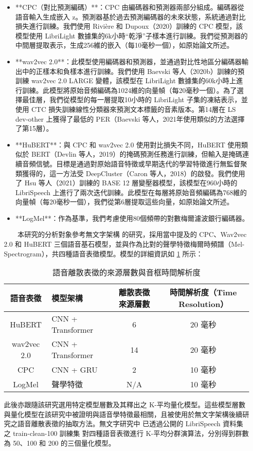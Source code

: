 \begin{itemize}
    \item **CPC（對比預測編碼）**：CPC 由編碼器和預測器兩部分組成。編碼器從語音輸入生成嵌入 z。預測器基於過去預測編碼器的未來狀態，系統通過對比損失進行訓練。我們使用 Rivière 和 Dupoux（2020）訓練的 CPC 模型，該模型使用 LibriLight 數據集的6k小時“乾淨”子樣本進行訓練。我們從預測器的中間層提取表示，生成256維的嵌入（每10毫秒一個），如原始論文所述。
    \item **wav2vec 2.0**：此模型使用編碼器和預測器，並通過對比性地區分編碼器輸出中的正樣本和負樣本進行訓練。我們使用 Baevski 等人（2020b）訓練的預訓練 wav2vec 2.0 LARGE 變體，該模型在 LibriLight 數據集的60k小時上進行訓練。此模型將原始音頻編碼為1024維的向量幀（每20毫秒一個）。為了選擇最佳層，我們從模型的每一層提取10小時的 LibriLight 子集的凍結表示，並使用 CTC 損失訓練線性分類器來預測文本標籤的音素版本。第14層在 LS dev-other 上獲得了最低的 PER（Baevski 等人，2021年使用類似的方法選擇了第15層）。
    \item **HuBERT**：與 CPC 和 wav2vec 2.0 使用對比損失不同，HuBERT 使用類似於 BERT（Devlin 等人，2019）的掩碼預測任務進行訓練，但輸入是掩碼連續音頻信號。目標是通過對原始語音特徵或早期迭代的學習特徵進行無監督聚類獲得的，這一方法受 DeepCluster（Caron 等人，2018）的啟發。我們使用了 Hsu 等人（2021）訓練的 BASE 12 層變壓器模型，該模型在960小時的 LibriSpeech 上進行了兩次迭代訓練。此模型在每層將原始音頻編碼為768維的向量幀（每20毫秒一個），我們從第6層提取這些向量，如原始論文所述。
    \item **LogMel**：作為基準，我們考慮使用80個頻帶的對數梅爾濾波銀行編碼器。
\end{itemize}


　　本研究的分析對象參考無文字架構 \cite{noauthor_textless_2021, lakhotia_generative_2021, lakhotia_generative_2021-1} 的研究，採用當中提及的 CPC、Wav2vec 2.0 和 HuBERT 三個語音基石模型，並與作為比對的聲學特徵梅爾時頻譜（Mel-Spectrogram），共四種語音表徵模型。模型的詳細資訊如 \ref{tab:model-info} 所示：

\begin{table}
    \centering
    \begin{tabular}{|c|l|c|c|} \hline 
         語音表徵&   模型架構&離散表徵來源層數& 時間解析度（Time Resolution）\\ \hline 
         HuBERT      &   CNN + Transformer&6& 20 毫秒\\ \hline 
         wav2vec 2.0 &   CNN + Transformer&14& 20 毫秒\\ \hline 
         CPC         &   CNN + GRU&2& 10 毫秒\\ \hline 
         LogMel      &   聲學特徵&N/A& 10 毫秒\\ \hline
    \end{tabular}
    \caption{語音離散表徵的來源層數與音框時間解析度}
    \label{tab:model-info}
\end{table}
此後亦跟隨該研究選用特定模型層數及其釋出之 K-平均量化模型。這些模型層數與量化模型在該研究中被證明與語音學特徵最相關，且被使用於無文字架構後續研究之語音離散表徵的抽取方法。無文字研究中 \cite{lakhotia_generative_2021-1} 已透過公開的 LibriSpeech 資料集之 train-clean-100 訓練集
對四種語音表徵進行 K-平均分群演算法，分別得到群數為 50、100 和 200 的三個量化模型。


